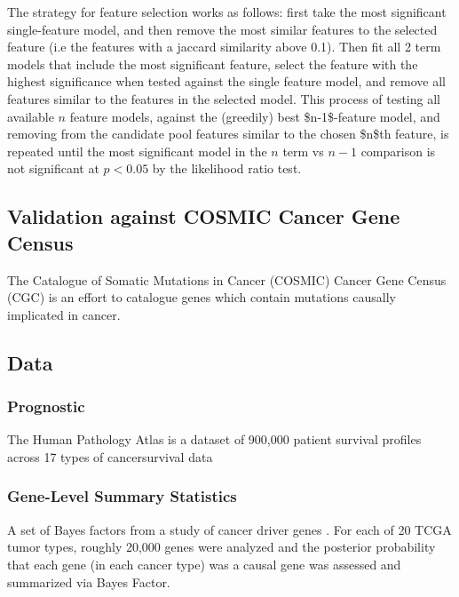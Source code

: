 \documentclass[11pt]{article}
\begin{document}
The strategy for feature selection works as follows: first take the most significant single-feature model,
and then remove the most similar features to the selected feature (i.e the features with a jaccard similarity above 0.1).
Then fit all 2 term models that include the most significant feature, select the feature with the highest significance when tested against the single 
feature model, and remove all features similar to the features in the selected model. This process of testing all available \(n\) feature models, against the
(greedily) best \$n-1\$-feature model, and removing from the candidate pool features similar to the chosen \$n\$th feature, is repeated until the most significant model in the \(n\) term vs
\(n-1\) comparison is not significant at \(p<0.05\) by the likelihood ratio test.


\subsection*{Validation against COSMIC Cancer Gene Census}
\label{sec:orgacb7f47}

The Catalogue of Somatic Mutations in Cancer (COSMIC) Cancer Gene Census (CGC) \cite{COSMIC} is an effort to catalogue genes which contain mutations
causally implicated in cancer.  



\subsection*{Data}
\label{sec:org2e8edcc}


\subsubsection*{Prognostic}
\label{sec:org8f6ca8a}

The Human Pathology Atlas is a dataset of 900,000 patient survival profiles across 17 types of cancersurvival data \cite{uhlen17_pathol_atlas_human_cancer_trans}

\subsubsection*{Gene-Level Summary Statistics}
\label{sec:org9c35a9f}

A set of Bayes factors from a study of cancer driver genes \cite{zhao19_detail_model_posit_selec_improv}.  For each of 20 TCGA tumor types, roughly 20,000 genes were analyzed and the 
posterior probability that each gene (in each cancer type) was a causal gene was assessed and summarized via Bayes Factor.  
\end{document}
